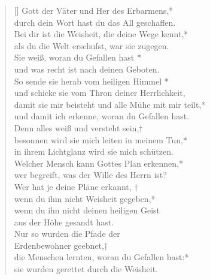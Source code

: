 \begin{verse}[\versewidth]
 Gott der Väter und Her des Erbarmens,*\\
durch dein Wort hast du das All geschaffen.\\
\vin Bei dir ist die Weisheit, die deine Wege kennt,*\\
\vin als du die Welt erschufst, war sie zugegen.\\
Sie weiß, woran du Gefallen hast *\\
und was recht ist nach deinen Geboten.\\
\vin So sende sie herab vom heiligen Himmel *\\
\vin und schicke sie vom Thron deiner Herrlichkeit,\\
damit sie mir beisteht und alle Mühe mit mir teilt,*\\
und damit ich erkenne, woran du Gefallen hast.\\
\vin Denn alles weiß und versteht sein,†\\
\vin besonnen wird sie mich leiten in meinem Tun,*\\
\vin in ihrem Lichtglanz wird sie mich schützen.\\
Welcher Mensch kann Gottes Plan erkennen,*\\
wer begreift, was der Wille des Herrn ist?\\
\vin Wer hat je deine Pläne erkannt, †\\
\vin wenn du ihm nicht Weisheit gegeben,*\\
\vin wenn du ihn nicht deinen heiligen Geist\\
\vin aus der Höhe gesandt hast.\\
Nur so wurden die Pfade der \\ Erdenbewohner geebnet,†\\
die Menschen lernten, woran du Gefallen hast:*\\
sie wurden gerettet durch die Weisheit.\\

\end{verse}




